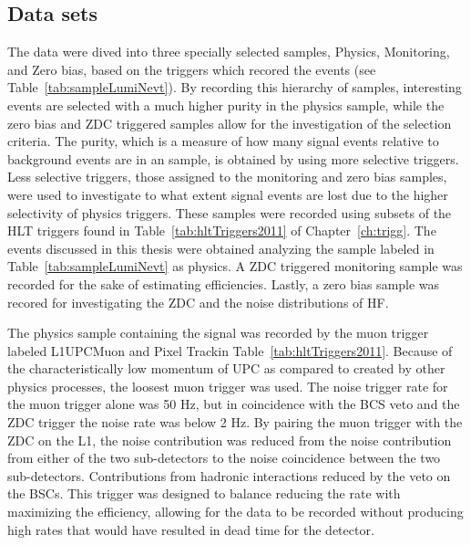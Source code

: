     \subsection{Data sets}
      The data were dived into three specially selected samples, Physics, Monitoring, 
        and Zero bias, based on the triggers which recored the events (see 
        Table~\ref{tab:sampleLumiNevt}).
      By recording this hierarchy of samples, interesting events are selected 
        with a much higher purity in the physics sample, while the zero bias 
        and ZDC triggered samples allow for the investigation of the selection 
        criteria. 
      The purity, which is a measure of how many signal events relative to
        background events are in an sample, is obtained by using more selective
        triggers.
      Less selective triggers, those assigned to the monitoring and zero bias 
        samples, were used to investigate to what extent signal events are lost
        due to the higher selectivity of physics triggers. 
      These samples were recorded using subsets of the HLT triggers found in 
        Table~\ref{tab:hltTriggers2011} of Chapter~\ref{ch:trigg}.
      The \JPsi{} events discussed in this thesis were obtained \DIFaddbegin {}\DIFaddend analyzing 
        the sample labeled in Table~\ref{tab:sampleLumiNevt} as physics.
      A ZDC triggered monitoring sample was recorded for the sake of estimating
        efficiencies.
      Lastly, a zero bias sample was recored for investigating the ZDC and the 
        noise distributions of HF.

      The physics sample containing the \JPsi{} signal was recorded by the muon 
        trigger labeled \DIFdelbegin {}\DIFdelend \DIFaddbegin {}\DIFaddend L1UPCMuon and Pixel Track\DIFdelbegin {}\DIFdelend \DIFaddbegin {}\DIFaddend in 
        Table~\ref{tab:hltTriggers2011}. 
      Because of the characteristically low momentum of UPC \JPsi{} as compared
        to \JPsi{} created by other physics processes, the loosest muon 
        trigger was used.
      The noise trigger rate for the muon trigger alone was 50 Hz, but in 
        coincidence with the BCS veto and the ZDC trigger the noise rate was
        below 2 Hz. 
      By pairing the muon trigger with the ZDC on the L1, the noise contribution
        was reduced from the noise contribution from either of the two 
        sub-detectors to the noise coincidence between the two sub-detectors. 
      Contributions from hadronic interactions \DIFdelbegin {}\DIFdelend \DIFaddbegin {}\DIFaddend reduced by the veto on the 
        BSCs.
      This trigger was designed to balance reducing the rate with maximizing 
        the efficiency, allowing for the data to be recorded without 
        producing high rates that would have resulted in dead time for the 
        detector.  

